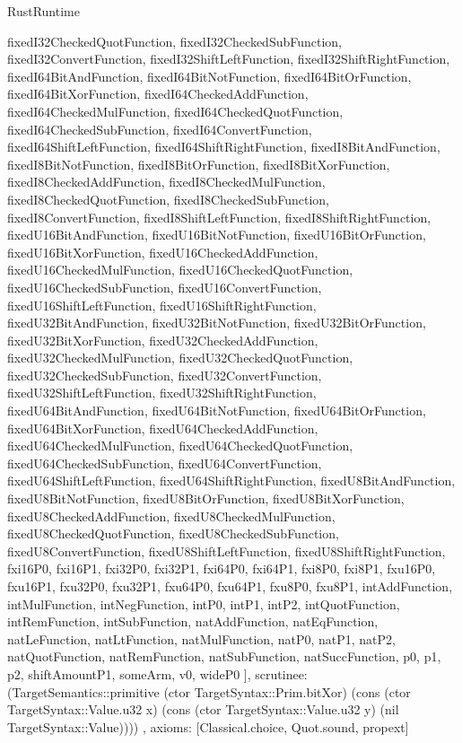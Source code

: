 \begin{lexlean}{RustRuntime}
\begin{semanticmodule}
{{      fixedI32CheckedQuotFunction,
      fixedI32CheckedSubFunction,
      fixedI32ConvertFunction,
      fixedI32ShiftLeftFunction,
      fixedI32ShiftRightFunction,
      fixedI64BitAndFunction,
      fixedI64BitNotFunction,
      fixedI64BitOrFunction,
      fixedI64BitXorFunction,
      fixedI64CheckedAddFunction,
      fixedI64CheckedMulFunction,
      fixedI64CheckedQuotFunction,
      fixedI64CheckedSubFunction,
      fixedI64ConvertFunction,
      fixedI64ShiftLeftFunction,
      fixedI64ShiftRightFunction,
      fixedI8BitAndFunction,
      fixedI8BitNotFunction,
      fixedI8BitOrFunction,
      fixedI8BitXorFunction,
      fixedI8CheckedAddFunction,
      fixedI8CheckedMulFunction,
      fixedI8CheckedQuotFunction,
      fixedI8CheckedSubFunction,
      fixedI8ConvertFunction,
      fixedI8ShiftLeftFunction,
      fixedI8ShiftRightFunction,
      fixedU16BitAndFunction,
      fixedU16BitNotFunction,
      fixedU16BitOrFunction,
      fixedU16BitXorFunction,
      fixedU16CheckedAddFunction,
      fixedU16CheckedMulFunction,
      fixedU16CheckedQuotFunction,
      fixedU16CheckedSubFunction,
      fixedU16ConvertFunction,
      fixedU16ShiftLeftFunction,
      fixedU16ShiftRightFunction,
      fixedU32BitAndFunction,
      fixedU32BitNotFunction,
      fixedU32BitOrFunction,
      fixedU32BitXorFunction,
      fixedU32CheckedAddFunction,
      fixedU32CheckedMulFunction,
      fixedU32CheckedQuotFunction,
      fixedU32CheckedSubFunction,
      fixedU32ConvertFunction,
      fixedU32ShiftLeftFunction,
      fixedU32ShiftRightFunction,
      fixedU64BitAndFunction,
      fixedU64BitNotFunction,
      fixedU64BitOrFunction,
      fixedU64BitXorFunction,
      fixedU64CheckedAddFunction,
      fixedU64CheckedMulFunction,
      fixedU64CheckedQuotFunction,
      fixedU64CheckedSubFunction,
      fixedU64ConvertFunction,
      fixedU64ShiftLeftFunction,
      fixedU64ShiftRightFunction,
      fixedU8BitAndFunction,
      fixedU8BitNotFunction,
      fixedU8BitOrFunction,
      fixedU8BitXorFunction,
      fixedU8CheckedAddFunction,
      fixedU8CheckedMulFunction,
      fixedU8CheckedQuotFunction,
      fixedU8CheckedSubFunction,
      fixedU8ConvertFunction,
      fixedU8ShiftLeftFunction,
      fixedU8ShiftRightFunction,
      fxi16P0,
      fxi16P1,
      fxi32P0,
      fxi32P1,
      fxi64P0,
      fxi64P1,
      fxi8P0,
      fxi8P1,
      fxu16P0,
      fxu16P1,
      fxu32P0,
      fxu32P1,
      fxu64P0,
      fxu64P1,
      fxu8P0,
      fxu8P1,
      intAddFunction,
      intMulFunction,
      intNegFunction,
      intP0,
      intP1,
      intP2,
      intQuotFunction,
      intRemFunction,
      intSubFunction,
      natAddFunction,
      natEqFunction,
      natLeFunction,
      natLtFunction,
      natMulFunction,
      natP0,
      natP1,
      natP2,
      natQuotFunction,
      natRemFunction,
      natSubFunction,
      natSuccFunction,
      p0,
      p1,
      p2,
      shiftAmountP1,
      someArm,
      v0,
      wideP0
    ],
    scrutinee: (TargetSemantics::primitive (ctor TargetSyntax::Prim.bitXor) (cons (ctor TargetSyntax::Value.u32 x) (cons (ctor TargetSyntax::Value.u32 y) (nil TargetSyntax::Value))))
  },
  axioms: [Classical.choice, Quot.sound, propext]
}


\end{semanticmodule}
\end{lexlean}
